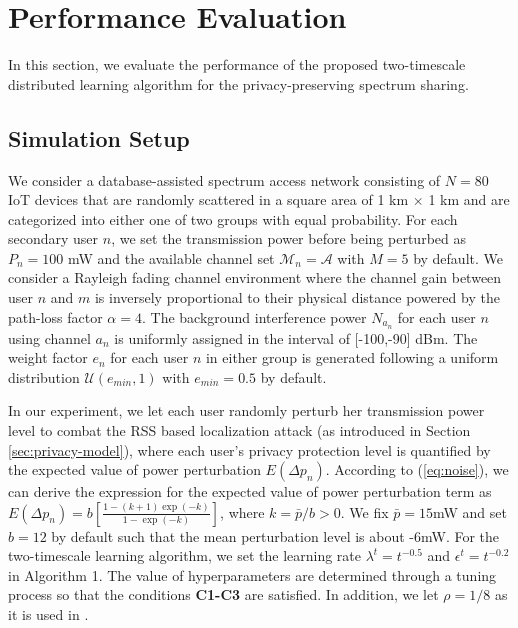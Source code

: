 \section{Performance Evaluation}\label{sec:simulation}

In this section, we evaluate the performance of the proposed two-timescale distributed learning algorithm for the privacy-preserving spectrum sharing.
\subsection{Simulation Setup}
We consider a database-assisted spectrum access network consisting of $N=80$ IoT devices that are randomly scattered in a square area of 1 km $\times$ 1 km and are categorized into either one of two groups with equal probability. For each secondary user $n$, we set the transmission power before being perturbed as $P_n=100$ mW \cite{FCC} and the available channel set $\mathcal{M}_n=\mathcal{A}$ with $M=5$ by default. We consider a Rayleigh fading channel environment where the channel gain between user $n$ and $m$ is inversely proportional to their physical distance powered by the path-loss factor $\alpha=4$. The background interference power $N_{a_n}$ for each user $n$ using channel $a_n$ is uniformly assigned in the interval of [-100,-90] dBm. The weight factor $e_{n}$ for each user $n$ in either group is generated following a uniform distribution $\mathcal{U}(e_{min},1)$ with $e_{min}=0.5$ by default.

In our experiment, we let each user randomly perturb her transmission power level to combat the RSS based localization attack (as introduced in Section \ref{sec:privacy-model}), where each user's privacy protection level is quantified by the expected value of power perturbation $E(\Delta p_n)$. According to (\ref{eq:noise}), we can derive the expression for the expected value of power perturbation term as $E(\Delta p_n)=b\left[\frac{1-(k+1)\exp(-k)}{1-\exp(-k)}\right]$, where $k=\bar{p}/b>0$. We fix $\bar{p}=15$mW and set $b=12$ by default such that the mean perturbation level is about -6mW.
For the two-timescale learning algorithm, we set the learning rate $\lambda^t=t^{-0.5}$ and $\epsilon^t=t^{-0.2}$ in Algorithm 1. The value of hyperparameters are determined through a tuning process so that the conditions \textbf{C1-C3} are satisfied. In addition, we let $\rho=1/8$ as it is used in \cite{Hart_areinforcement}. 

